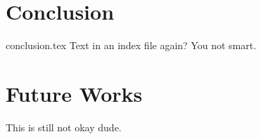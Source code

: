 \chapter{Conclusion}
{conclusion.tex}
Text in an index file again? You not smart.
\chapter{Future Works}
This is still not okay dude.
